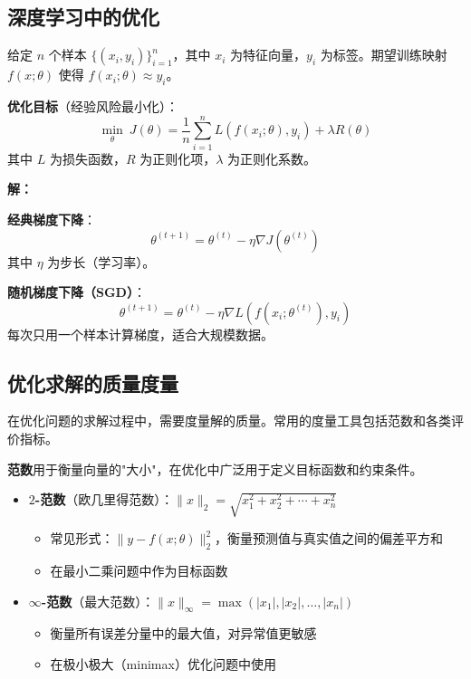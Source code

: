 \subsection{深度学习中的优化}

\begin{conceptbox}[深度学习优化问题]
给定 $n$ 个样本 $\{(x_i, y_i)\}_{i=1}^n$，其中 $x_i$ 为特征向量，$y_i$ 为标签。期望训练映射 $f(x; \theta)$ 使得 $f(x_i; \theta) \approx y_i$。

\textbf{优化目标}（经验风险最小化）：
\[
\min_\theta\ J(\theta) = \frac{1}{n}\sum_{i=1}^{n} L(f(x_i; \theta), y_i) + \lambda R(\theta)
\]
其中 $L$ 为损失函数，$R$ 为正则化项，$\lambda$ 为正则化系数。
\end{conceptbox}

\begin{example}[神经网络的梯度下降]
\textbf{解：}

\textbf{经典梯度下降}：
\[
\theta^{(t+1)} = \theta^{(t)} - \eta \nabla J(\theta^{(t)})
\]
其中 $\eta$ 为步长（学习率）。

\textbf{随机梯度下降（SGD）}：
\[
\theta^{(t+1)} = \theta^{(t)} - \eta \nabla L(f(x_i; \theta^{(t)}), y_i)
\]
每次只用一个样本计算梯度，适合大规模数据。
\end{example}

\subsection{优化求解的质量度量}

在优化问题的求解过程中，需要度量解的质量。常用的度量工具包括范数和各类评价指标。

\begin{conceptbox}[优化中的范数]
\textbf{范数}用于衡量向量的"大小"，在优化中广泛用于定义目标函数和约束条件。

\begin{itemize}[itemsep=0.3em]
    \item \textbf{$2$-范数}（欧几里得范数）：$\|x\|_2 = \sqrt{x_1^2 + x_2^2 + \cdots + x_n^2}$
    \begin{itemize}
        \item 常见形式：$\|y - f(x; \theta)\|_2^2$，衡量预测值与真实值之间的偏差平方和
        \item 在最小二乘问题中作为目标函数
    \end{itemize}
    \item \textbf{$\infty$-范数}（最大范数）：$\|x\|_\infty = \max(|x_1|, |x_2|, \ldots, |x_n|)$
    \begin{itemize}
        \item 衡量所有误差分量中的最大值，对异常值更敏感
        \item 在极小极大（minimax）优化问题中使用
    \end{itemize}
\end{itemize}
\end{conceptbox}

